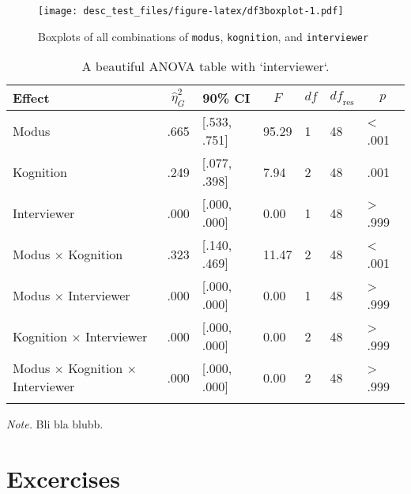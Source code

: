 \documentclass[
  doc,floatsintext]{apa6}
\begin{document}
\begin{figure}
\centering
\texttt{[image: desc\_test\_files/figure-latex/df3boxplot-1.pdf]}
\caption{\label{fig:df3boxplot}Boxplots of all combinations of \texttt{modus}, \texttt{kognition}, and \texttt{interviewer}}
\end{figure}

\begin{table}[tbp]

\begin{center}
\begin{threeparttable}

\caption{\label{tab:tabanova3}A beautiful ANOVA table with `interviewer`.}

\begin{tabular}{lllllll}
\toprule
Effect & \multicolumn{1}{c}{$\hat{\eta}^2_G$} & \multicolumn{1}{c}{90\% CI} & \multicolumn{1}{c}{$F$} & \multicolumn{1}{c}{$\mathit{df}$} & \multicolumn{1}{c}{$\mathit{df}_{\mathrm{res}}$} & \multicolumn{1}{c}{$p$}\\
\midrule
Modus & .665 & {}[.533, .751] & 95.29 & 1 & 48 & < .001\\
Kognition & .249 & {}[.077, .398] & 7.94 & 2 & 48 & .001\\
Interviewer & .000 & {}[.000, .000] & 0.00 & 1 & 48 & > .999\\
Modus $\times$ Kognition & .323 & {}[.140, .469] & 11.47 & 2 & 48 & < .001\\
Modus $\times$ Interviewer & .000 & {}[.000, .000] & 0.00 & 1 & 48 & > .999\\
Kognition $\times$ Interviewer & .000 & {}[.000, .000] & 0.00 & 2 & 48 & > .999\\
Modus $\times$ Kognition $\times$ Interviewer & .000 & {}[.000, .000] & 0.00 & 2 & 48 & > .999\\
\bottomrule
\addlinespace
\end{tabular}

\begin{tablenotes}[para]
\normalsize{\textit{Note.} Bli bla blubb.}
\end{tablenotes}

\end{threeparttable}
\end{center}

\end{table}

\newpage

\hypertarget{excercises}{%
\section{Excercises}\label{excercises}}
\end{document}
